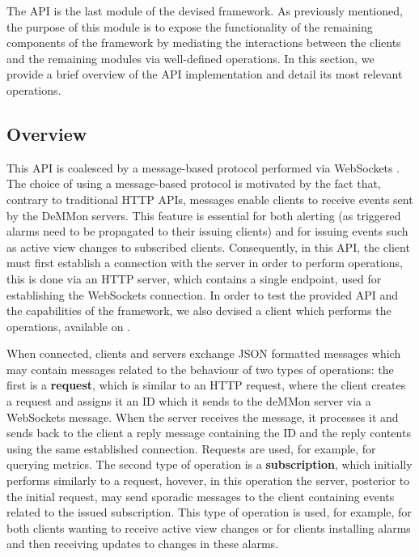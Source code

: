 
The API is the last module of the devised framework. As previously mentioned, the purpose of this module is to expose the functionality of the remaining components of the framework by mediating the interactions between the clients and the remaining modules via well-defined operations. In this section, we provide a brief overview of the API implementation and detail its most relevant operations. 

\subsection{Overview}

This API is coalesced by a message-based protocol performed via WebSockets . The choice of using a message-based protocol is motivated by the fact that, contrary to traditional HTTP APIs, messages enable clients to receive events sent by the DeMMon servers. This feature is essential for both alerting (as triggered alarms need to be propagated to their issuing clients) and for issuing events such as active view changes to subscribed clients. Consequently, in this API, the client must first establish a connection with the server in order to perform operations, this is done via an HTTP server, which contains a single endpoint, used for establishing the WebSockets connection. In order to test the provided API and the capabilities of the framework, we also devised a client which performs the operations, available on .

When connected, clients and servers exchange JSON formatted messages which may contain messages related to the behaviour of two types of operations: the first is a \textbf{request}, which is similar to an HTTP request, where the client creates a request and assigns it an ID which it sends to the deMMon server via a WebSockets message. When the server receives the message, it processes it and sends back to the client a reply message containing the ID and the reply contents using the same established connection. Requests are used, for example, for querying metrics. The second type of operation is a \textbf{subscription}, which initially performs similarly to a request, hovever, in this operation the server, posterior to the initial request, may send sporadic messages to the client containing events related to the issued subscription. This type of operation is used, for example, for both clients wanting to receive active view changes or for clients installing alarms and then receiving updates to changes in these alarms.

